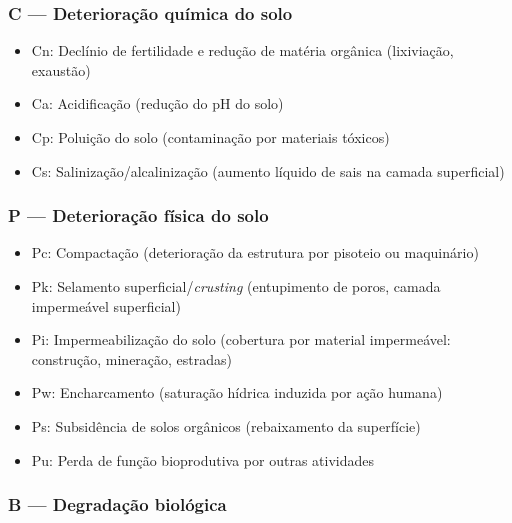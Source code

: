 \subsubsection{C --- Deterioração química do solo}\label{c-deteriorauxe7uxe3o-quuxedmica-do-solo}

\begin{itemize}
\tightlist
\item[$\square$]
  Cn: Declínio de fertilidade e redução de matéria orgânica (lixiviação, exaustão)
\item[$\square$]
  Ca: Acidificação (redução do pH do solo)
\item[$\square$]
  Cp: Poluição do solo (contaminação por materiais tóxicos)
\item[$\square$]
  Cs: Salinização/alcalinização (aumento líquido de sais na camada superficial)
\end{itemize}

\subsubsection{P --- Deterioração física do solo}\label{p-deteriorauxe7uxe3o-fuxedsica-do-solo}

\begin{itemize}
\tightlist
\item[$\square$]
  Pc: Compactação (deterioração da estrutura por pisoteio ou maquinário)
\item[$\square$]
  Pk: Selamento superficial/\emph{crusting} (entupimento de poros, camada impermeável superficial)
\item[$\square$]
  Pi: Impermeabilização do solo (cobertura por material impermeável: construção, mineração, estradas)
\item[$\square$]
  Pw: Encharcamento (saturação hídrica induzida por ação humana)
\item[$\square$]
  Ps: Subsidência de solos orgânicos (rebaixamento da superfície)
\item[$\square$]
  Pu: Perda de função bioprodutiva por outras atividades
\end{itemize}

\subsubsection{B --- Degradação biológica}\label{b-degradauxe7uxe3o-bioluxf3gica}

